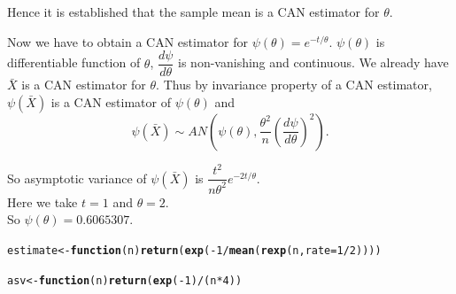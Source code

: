 \documentclass[11pt, a4paper]{article}\usepackage[]{graphicx}\usepackage[]{xcolor}
\makeatletter
\newcommand{\hlnum}[1]{\textcolor[rgb]{0.686,0.059,0.569}{#1}}%
\newcommand{\hlopt}[1]{\textcolor[rgb]{0,0,0}{#1}}%
\newcommand{\hldef}[1]{\textcolor[rgb]{0.345,0.345,0.345}{#1}}%
\newcommand{\hlkwa}[1]{\textcolor[rgb]{0.161,0.373,0.58}{\textbf{#1}}}%
\newcommand{\hlkwb}[1]{\textcolor[rgb]{0.69,0.353,0.396}{#1}}%
\newcommand{\hlkwc}[1]{\textcolor[rgb]{0.333,0.667,0.333}{#1}}%
\newcommand{\hlkwd}[1]{\textcolor[rgb]{0.737,0.353,0.396}{\textbf{#1}}}%
\newenvironment{kframe}{%
 \def\at@end@of@kframe{}%
 \ifinner\ifhmode%
  \def\at@end@of@kframe{\end{minipage}}%
  \begin{minipage}{\columnwidth}%
 \fi\fi%
 \def\FrameCommand##1{\hskip\@totalleftmargin \hskip-\fboxsep
 \colorbox{shadecolor}{##1}\hskip-\fboxsep
     \hskip-\linewidth \hskip-\@totalleftmargin \hskip\columnwidth}%
 \MakeFramed {\advance\hsize-\width
   \@totalleftmargin\z@ \linewidth\hsize
   \@setminipage}}%
 {\par\unskip\endMakeFramed%
 \at@end@of@kframe}
\newenvironment{knitrout}{}{} %
\makeatother
\begin{document}

{\setlength{\spaceskip}{1em plus 0.5em minus 0.5em} \fontsize{17}{20}\myfont Hence it is established that the sample mean is a CAN estimator for $\theta$. \par}

\vspace{1cm}

\leftpointright \hspace{0.5cm} Now we have to obtain a CAN estimator for $\psi{(\theta)} = e^{-t/ \theta}$. $\psi{(\theta)}$ is differentiable function of $\theta$, $\dfrac{d\psi}{d\theta}$ is non-vanishing and continuous. We already have $\bar{X}$ is a CAN estimator for $\theta$. Thus by invariance property of a CAN estimator, $\psi{(\bar{X})}$ is a CAN estimator of $\psi{(\theta)}$ and 
$$\psi{(\bar{X})} \sim AN \left(\psi{(\theta)}, \dfrac{\theta^2}{n} \left( \dfrac{d\psi}{d\theta} \right)^2 \right).$$

So asymptotic variance of $\psi{(\bar{X})}$ is $\dfrac{t^2}{n \theta^2} e^{-2t / \theta}.$ \\

Here we take $t = 1$ and $\theta = 2$. \\

So $\psi{(\theta)} = 0.6065307$.

\begin{knitrout}
\color{fgcolor}\begin{kframe}
\begin{alltt}
\hldef{estimate} \hlkwb{<-} \hlkwa{function}\hldef{(}\hlkwc{n}\hldef{)} \hlkwd{return}\hldef{(}\hlkwd{exp}\hldef{(}\hlopt{-}\hlnum{1}\hlopt{/}\hlkwd{mean}\hldef{(}\hlkwd{rexp}\hldef{(n,} \hlkwc{rate} \hldef{=} \hlnum{1}\hlopt{/}\hlnum{2}\hldef{))))}

\hldef{asv} \hlkwb{<-} \hlkwa{function}\hldef{(}\hlkwc{n}\hldef{)} \hlkwd{return}\hldef{(}\hlkwd{exp}\hldef{(}\hlopt{-}\hlnum{1}\hldef{)} \hlopt{/} \hldef{(n} \hlopt{*} \hlnum{4}\hldef{))}
\end{alltt}
\end{kframe}
\end{knitrout}
\end{document}
